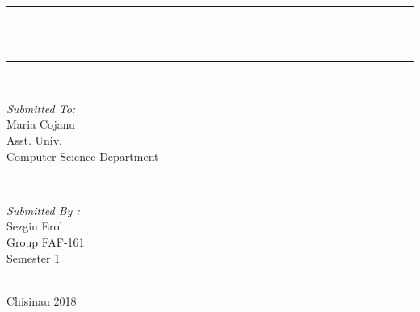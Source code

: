 \documentclass[12pt]{article}
\makeatletter
\let\thetitle\@title
\makeatother
\begin{document}
\begin{titlepage}
                \rule{\linewidth}{0.2 mm} \\[0.4 cm]

                { \huge \bfseries \thetitle}\\
                \rule{\linewidth}{0.2 mm} \\[1.5 cm]
                
                \begin{minipage}{0.4\textwidth}
                        \begin{flushleft} \large
                                \emph{Submitted To:}\\
                                Maria Cojanu\\
                Asst. Univ.\\
                Computer Science Department\\
                            \end{flushleft}
                            \end{minipage}~
                            \begin{minipage}{0.4\textwidth}
                
                            \begin{flushright} \large
                            \emph{Submitted By :} \\
                            Sezgin Erol\\
                
                Group FAF-161\\
                Semester 1\\
                    \end{flushright}
                
                \end{minipage}\\[2 cm]
                
                \vfill Chisinau 2018\\  
        \end{titlepage}
        
\end{document}
